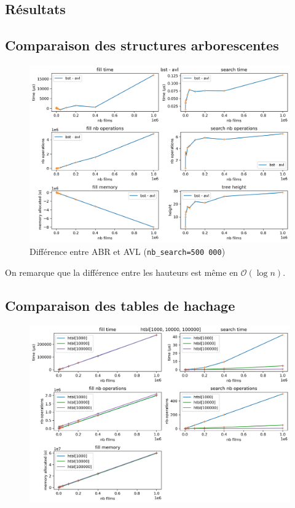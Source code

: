 \documentclass[a4paper, 12pt, twoside]{article}
\begin{document}
\begin{indt}{\section{Résultats}}
\begin{indt}{\subsection{Comparaison des structures arborescentes}}
\begin{figure}[H]
                \includegraphics[width=1.0\textwidth]{../plots/nb_search_500_000/bst_minus_avl.png}
            
                \caption{Différence entre ABR et AVL (\texttt{nb\_search=500 000})}
                \label{fig:bst_minus_avl}
            \end{figure}

            On remarque que la différence entre les hauteurs est même en $\mathcal O(\log n)$.
        \end{indt} %

        \begin{indt}{\subsection{Comparaison des tables de hachage}} %
            \begin{figure}[H]
                \centering
            
                \includegraphics[width=1.0\textwidth]{../plots/nb_search_500_000/htbl.png}
            

\end{figure}
\end{indt}
\end{indt}
\end{document}
